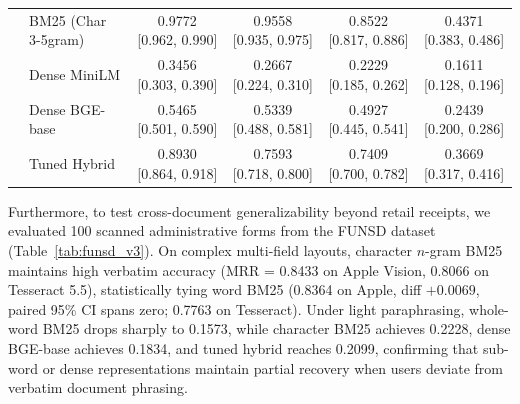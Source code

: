 \documentclass[conference]{IEEEtran}
\begin{document}
\begin{table}[t]
{\begin{tabular}{llcccc}
 & BM25 (Char 3-5gram)     & 0.9772 [0.962, 0.990] & 0.9558 [0.935, 0.975] & 0.8522 [0.817, 0.886] & 0.4371 [0.383, 0.486] \\
 & Dense MiniLM            & 0.3456 [0.303, 0.390] & 0.2667 [0.224, 0.310] & 0.2229 [0.185, 0.262] & 0.1611 [0.128, 0.196] \\
 & Dense BGE-base          & 0.5465 [0.501, 0.590] & 0.5339 [0.488, 0.581] & 0.4927 [0.445, 0.541] & 0.2439 [0.200, 0.286] \\
 & Tuned Hybrid            & 0.8930 [0.864, 0.918] & 0.7593 [0.718, 0.800] & 0.7409 [0.700, 0.782] & 0.3669 [0.317, 0.416] \\
\bottomrule
\end{tabular}}
\end{table}

Furthermore, to test cross-document generalizability beyond retail receipts, we evaluated 100 scanned administrative forms from the FUNSD dataset \cite{jaume2019funsd} (Table~\ref{tab:funsd_v3}). On complex multi-field layouts, character $n$-gram BM25 maintains high verbatim accuracy (MRR = 0.8433 on Apple Vision, 0.8066 on Tesseract 5.5), statistically tying word BM25 (0.8364 on Apple, diff $+0.0069$, paired 95\% CI spans zero; 0.7763 on Tesseract). Under light paraphrasing, whole-word BM25 drops sharply to 0.1573, while character BM25 achieves 0.2228, dense BGE-base achieves 0.1834, and tuned hybrid reaches 0.2099, confirming that sub-word or dense representations maintain partial recovery when users deviate from verbatim document phrasing.
\end{document}
